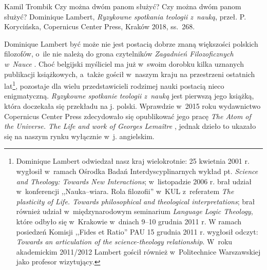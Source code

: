 \begin{recplenv}{Kamil Trombik}
	{Czy można dwóm panom służyć?}
	{Czy można dwóm panom służyć?}
	{Dominique Lambert, \textit{Ryzykowne spotkania teologii z~nauką}, przeł. P. Korycińska, Copernicus Center Press, Kraków 2018,
		ss.~268.}




Dominique Lambert być może nie jest postacią dobrze znaną większości polskich filozofów, o~ile nie należą do grona
czytelników \textit{Zagadnień Filozoficznych w~Nauce}
\parencite{lambert_relativites_2005}.
Choć belgijski myśliciel ma już w~swoim dorobku kilka uznanych publikacji książkowych, a~także gościł w~naszym
kraju na przestrzeni ostatnich lat\footnote{Dominique Lambert odwiedzał nasz kraj wielokrotnie: 25 kwietnia 2001 r.
wygłosił w~ramach Ośrodka Badań Interdyscyplinarnych wykład pt. \textit{Science and Theology: Towards New
Interactions}; w~listopadzie 2006 r. brał udział w~konferencji ,,Nauka–wiara. Rola filozofii'' w~KUL z~referatem
\textit{The plasticity of Life. Towards philosophical and theological interpretations}; brał również
udział w~międzynarodowym seminarium \textit{Language Logic Theology}, które odbyło się w~Krakowie w~dniach 9–10 grudnia 2011 r.
W ramach posiedzeń Komisji ,,Fides et Ratio'' PAU 15 grudnia 2011 r. wygłosił odczyt: \textit{Towards an articulation of
the science-theology relationship}. W~roku akademickim 2011/2012 Lambert gościł również w~Politechnice Warszawskiej
jako profesor wizytujący. }, pozostaje dla wielu przedstawicieli rodzimej nauki postacią nieco enigmatyczną.
\textit{Ryzykowne spotkanie teologii z~nauką} jest pierwszą jego książką, która doczekała się przekładu na j. polski.
Wprawdzie w~2015 roku wydawnictwo Copernicus Center Press zdecydowało się opublikować jego pracę \textit{The Atom of
the Universe. The Life and work of Georges Lemaître}
\parencite{lambert_atom_2015},
jednak dzieło to
ukazało się na naszym rynku wyłącznie w~j. angielskim. 


\end{recplenv}
